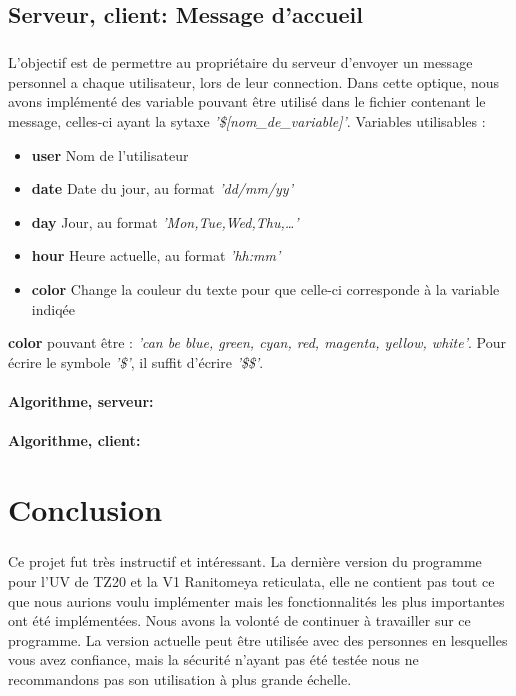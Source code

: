\documentclass[12pt,a4paper,twoside]{article}
\begin{document}
		\subsection{Serveur, client: Message d'accueil} %
			\subparagraph*{}
				L'objectif est de permettre au propriétaire du serveur d'envoyer un message personnel a chaque utilisateur, lors de leur connection.
				Dans cette optique, nous avons implémenté des variable pouvant être utilisé dans le fichier contenant le message, celles-ci ayant la sytaxe \textit{'\$[nom\_de\_variable]'}.
				Variables utilisables :
				\begin{itemize}
					\item{} \textbf{user} Nom de l'utilisateur
					\item{} \textbf{date} Date du jour, au format \textit{'dd/mm/yy'}
					\item{} \textbf{day} Jour, au format \textit{'Mon,Tue,Wed,Thu,\ldots'}
					\item{} \textbf{hour} Heure actuelle, au format \textit{'hh:mm'}
					\item{} \textbf{color} Change la couleur du texte pour que celle-ci corresponde à la variable indiqée
				\end{itemize}
				\textbf{color} pouvant être : \textit{'can be blue, green, cyan, red, magenta, yellow, white'}.
				Pour écrire le symbole \textit{'\$'}, il suffit d'écrire \textit{'\$\$'}.
			\paragraph*{Algorithme, serveur:}
				
				
			\paragraph*{Algorithme, client:}
				
				
	\section{Conclusion} %
		\subparagraph*{}
			Ce projet fut très instructif et intéressant. La dernière version du programme pour l'UV de TZ20 et la V1 Ranitomeya reticulata, elle ne contient pas tout ce que nous aurions voulu implémenter mais les fonctionnalités les plus importantes ont été implémentées. Nous avons la volonté de continuer à travailler sur ce programme. La version actuelle peut être utilisée avec des personnes en lesquelles vous avez confiance, mais la sécurité n’ayant pas été testée nous ne recommandons pas son utilisation à plus grande échelle.
\end{document}
